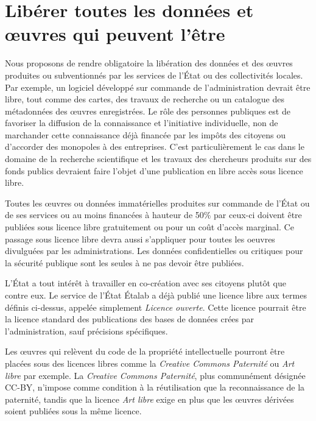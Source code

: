 \section{Libérer toutes les données et œuvres qui peuvent l'être}
Nous proposons de rendre obligatoire la libération des données et des œuvres produites ou subventionnés par les services de l’État ou des collectivités locales. Par exemple, un logiciel développé sur commande de l’administration devrait être libre, tout comme des cartes, des travaux de recherche ou un catalogue des métadonnées des œuvres enregistrées. Le rôle des personnes publiques est de favoriser la diffusion de la connaissance et l’initiative individuelle, non de marchander cette connaissance déjà financée par les impôts des citoyens ou d’accorder des monopoles à des entreprises. C'est particulièrement le cas dans le domaine de la recherche scientifique et les travaux des chercheurs produits sur des fonds publics devraient faire l'objet d'une publication en libre accès sous licence libre.

\begin{mesure}
Toutes les œuvres ou données immatérielles produites sur commande de l'État ou de ses services ou au moins financées à hauteur de 50\% par ceux-ci doivent être publiées sous licence libre gratuitement ou pour un coût d'accès marginal. Ce passage sous licence libre devra aussi s'appliquer pour toutes les oeuvres divulguées par les administrations. Les données confidentielles ou critiques pour la sécurité publique sont les seules à ne pas devoir être publiées.
\end{mesure}

L'État a tout intérêt à travailler en co-création avec ses citoyens plutôt que contre eux. Le service de l'État Étalab a déjà publié une licence libre aux termes définis ci-dessus, appelée simplement \textit{Licence ouverte}. Cette licence pourrait être la licence standard des publications des bases de données crées par l'administration, sauf précisions spécifiques. 

Les œuvres qui relèvent du code de la propriété intellectuelle pourront être placées sous des licences libres comme la \textit{Creative Commons Paternité} ou \textit{Art libre} par exemple. La \textit{Creative Commons Paternité}, plus communément désignée CC-BY, n'impose comme condition à la réutilisation que la reconnaissance de la paternité, tandis que la licence \textit{Art libre} exige en plus que les œuvres dérivées soient publiées sous la même licence.

